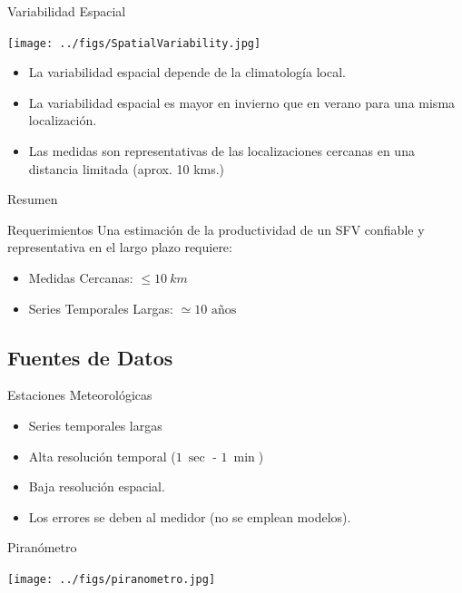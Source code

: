 \documentclass[xcolor={usenames,svgnames,dvipsnames}]{beamer}
\begin{document}
\begin{frame}[label={sec:org2b0a273}]{Variabilidad Espacial}
\begin{center}
\texttt{[image: ../figs/SpatialVariability.jpg]}
\end{center}

\begin{itemize}
\item La variabilidad espacial depende de la \alert{climatología local}.
\item La variabilidad espacial es \alert{mayor en invierno que en verano} para una misma localización.
\item Las medidas son representativas de las localizaciones cercanas en una distancia limitada (aprox. 10 kms.)
\end{itemize}
\end{frame}

\begin{frame}[label={sec:org024ca9f}]{Resumen}
\begin{block}{Requerimientos}
Una estimación de la productividad de un SFV confiable y representativa en el largo plazo requiere:
\begin{itemize}
\item \alert{Medidas Cercanas}: \(\leq \SI{10}{km}\)
\item \alert{Series Temporales Largas}: \(\simeq 10 \text{ años}\)
\end{itemize}
\end{block}
\end{frame}

\subsection{Fuentes de Datos}
\label{sec:orgdbee50f}
\begin{frame}[label={sec:orgfddd41b}]{Estaciones Meteorológicas}
\begin{itemize}
\item Series temporales largas
\item Alta resolución temporal (\(\SI{1}{\sec}\) - \(\SI{1}{\min}\))
\item Baja resolución espacial.
\item Los errores se deben al medidor (no se emplean modelos).
\end{itemize}

\begin{block}{Piranómetro}
\begin{center}
\texttt{[image: ../figs/piranometro.jpg]}
\end{center}
\end{block}
\end{frame}
\end{document}
